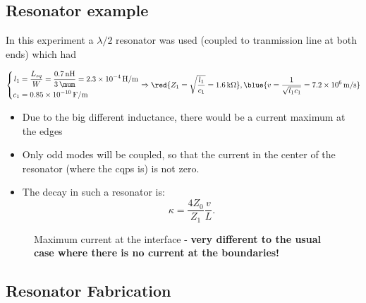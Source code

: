 \subsection{Resonator example \cite{Astafiev_2012}}
\label{sec:using-resonators}

In  this  experiment a  $\lambda/2$  resonator  was used  (coupled  to
tranmission line at both ends) which had

\begin{equation}
  \left\{
    \begin{aligned}
      l_{1} & = \frac{L_{sq}}{W} = \frac{0.7\,\text{nH}}{3\,\mum} = 2.3\times 10^{-4}\,\text{H/m} \\
      c_{1} & = 0.85\times 10^{-10}\,\text{F/m}
    \end{aligned}
  \right. \Rightarrow \red{Z_1 = \sqrt{\frac{l_{1}}{c_{1}}} = 1.6\,\text{k}\Omega}, \blue{v = \frac{1}{\sqrt{l_1c_1}} = 7.2\times 10^{6}\,\text{m/s}}
\end{equation}

\begin{framed}\noindent
  \begin{itemize}
  \item Due to the big different  inductance, there would be a current
    maximum at the edges
  \item Only  odd modes will  be coupled, so  that the current  in the
    center of the resonator (where the cqps is) is not zero.
  \item The decay in such a resonator is:
    \begin{equation}
      \kappa = \frac{4Z_{0}}{Z_{1}}\frac{v}{L}.
    \end{equation}

    \noindent
  \end{itemize}
\end{framed}

\begin{figure}[h]
  \centering {}
  \caption{\small  Maximum current  at  the  interface -  \textbf{very
      different to  the usual case  where there  is no current  at the
      boundaries!}\label{fig:resonator_current_maximum}}
\end{figure}

\subsection{Resonator Fabrication}
\label{sec:reson-fabr}


